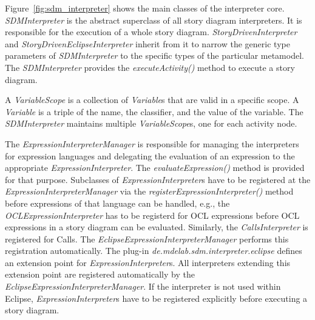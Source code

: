 Figure~\ref{fig:sdm_interpreter} shows the main classes of the interpreter core. 
\emph{SDMInterpreter} is the abstract superclass of all story diagram interpreters. 
It is responsible for the execution of a whole story diagram. 
\emph{StoryDrivenInterpreter} and \emph{StoryDrivenEclipseInterpreter} inherit from it to narrow the generic type parameters of \emph{SDMInterpreter} to the specific types of the particular metamodel. 
The \emph{SDMInterpreter} provides the \emph{executeActivity()} method to execute a story diagram.

A \emph{VariableScope} is a collection of \emph{Variable}s that are valid in a specific scope.
A \emph{Variable} is a triple of the name, the classifier, and the value of the variable.
The \emph{SDMInterpreter} maintains multiple \emph{VariableScope}s, one for each activity node.

The \emph{ExpressionInterpreterManager} is responsible for managing the interpreters for expression languages and delegating the evaluation of an expression to the appropriate \emph{ExpressionInterpreter}. 
The \emph{evaluateExpression()} method is provided for that purpose. 
Subclasses of \emph{ExpressionInterpreter}s have to be registered at the \emph{ExpressionInterpreterManager} via the \emph{registerExpressionInterpreter()} method before expressions of that language can be handled, e.g., the \emph{OCLExpressionInterpreter} has to be registerd for OCL expressions before OCL expressions in a story diagram can be evaluated.
Similarly, the \emph{CallsInterpreter} is registered for Calls.
The \emph{EclipseExpressionInterpreterManager} performs this registration automatically. 
The plug-in \emph{de.mdelab.sdm.interpreter.eclipse} defines an extension point for \emph{ExpressionInterpreter}s. 
All interpreters extending this extension point are registered automatically by the \emph{EclipseExpressionInterpreterManager}. 
If the interpreter is not used within Eclipse, \emph{ExpressionInterpreter}s have to be registered explicitly before executing a story diagram.

